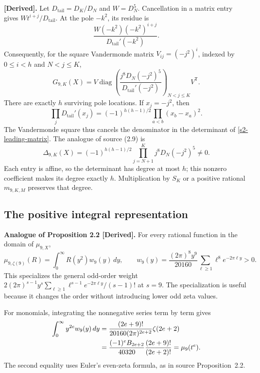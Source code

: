 \noindent\textbf{[Derived].}
Let $D_{\mathrm{tail}}=D_K/D_N$ and $W=D_N^5$.  Cancellation in a
matrix entry gives $Wt^{i+j}/D_{\mathrm{tail}}$.  At the pole $-k^2$,
its residue is
\[
 \frac{W(-k^2)(-k^2)^{i+j}}{D_{\mathrm{tail}}'(-k^2)}.
\]
Consequently, for the square Vandermonde matrix
$V_{ij}=(-j^2)^i$, indexed by $0\leq i<h$ and $N<j\leq K$,
\begin{equation}
 [X]G_{9,K}(X)=V\operatorname{diag}\!\left(
 \frac{j^8D_N(-j^2)^5}{D_{\mathrm{tail}}'(-j^2)}
 \right)_{N<j\leq K}V^{\mathsf T}.
 \label{s2-leading-matrix}
\end{equation}
There are exactly $h$ surviving pole locations.  If $x_j=-j^2$, then
\[
 \prod_jD_{\mathrm{tail}}'(x_j)
   =(-1)^{h(h-1)/2}\prod_{a<b}(x_b-x_a)^2.
\]
The Vandermonde square thus cancels the denominator in the determinant
of \eqref{s2-leading-matrix}.  The analogue of source (2.9) is
\begin{equation}
 [X^h]\Delta_{9,K}(X)
   =(-1)^{h(h-1)/2}
     \prod_{j=N+1}^{K}j^8D_N(-j^2)^5\ne0.
 \label{s2-leading-coefficient}
\end{equation}
Each entry is affine, so the determinant has degree at most $h$; this
nonzero coefficient makes its degree exactly $h$.  Multiplication by
$S_K$ or a positive rational $m_{9,K,M}$ preserves that degree.

\subsection{The positive integral representation}
\label{s2-positivity}

\noindent\textbf{Analogue of Proposition 2.2 [Derived].}
For every rational function in the domain of $\mu_{9,X}$,
\begin{equation}
 \mu_{9,\zeta(9)}(R)=\int_0^\infty R(y^2)w_9(y)\,dy,
 \qquad
 w_9(y)=\frac{(2\pi)^8y^9}{20160}
           \sum_{\ell\geq1}\ell^8e^{-2\pi\ell y}>0.
 \label{s2-integral}
\end{equation}
This specializes the general odd-order weight
$2(2\pi)^{s-1}y^s\sum_{\ell\geq1}\ell^{s-1}e^{-2\pi\ell y}/(s-1)!$
at $s=9$.  The specialization is useful because it changes the order
without introducing lower odd zeta values.

For monomials, integrating the nonnegative series term by term gives
\begin{align}
 \int_0^\infty y^{2e}w_9(y)\,dy
 &=\frac{(2e+9)!}{20160(2\pi)^{2e+2}}\zeta(2e+2)
 \notag\\
 &=\frac{(-1)^eB_{2e+2}}{40320}
       \frac{(2e+9)!}{(2e+2)!}
 =\mu_9(t^e).
 \label{s2-moment-integral}
\end{align}
The second equality uses Euler's even-zeta formula, as in source
Proposition~2.2.

